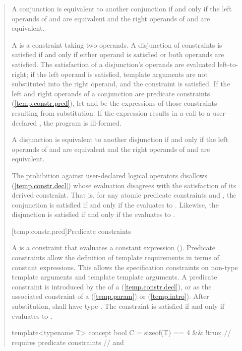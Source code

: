 \begin{quote}
A conjunction  is equivalent to another conjunction 
if and only if the left operands of  and  are equivalent
and the right operands of  and  are equivalent.

\pnum
A  is a constraint taking two 
operands. A disjunction of constraints is satisfied if and only 
if either operand is satisfied or both operands are satisfied.
% 
The satisfaction of a disjunction's operands are evaluated left-to-right; 
if the left operand is satisfied, template arguments are not 
substituted into the right operand, and the constraint is satisfied.
%
If the left and right operands of a conjunction are predicate constraints
(\ref{temp.constr.pred}), let  and  be the expressions
of those constraints resulting from substitution. If the expression
 results in a call to a user-declared ,
the program is ill-formed.

A disjunction  is equivalent to another disjunction 
if and only if the left operands of  and  are equivalent
and the right operands of  and  are equivalent.

\pnum
\enternote
The prohibition against user-declared logical operators disallows
 (\ref{temp.constr.decl}) whose 
evaluation disagrees with the satisfaction of its derived constraint.
That is, for any atomic predicate constraints  and ,
the conjunction  is satisfied if and only if
the   evaluates to
. Likewise, the disjunction  is satisfied 
if and only if the  
evaluates to .
\exitnote


[temp.constr.pred]{Predicate constraints}

\pnum
A  is a constraint that evaluates a constant 
expression  ().
% 
\enternote
Predicate constraints allow the definition of template requirements
in terms of constant expressions. This allows the specification 
constraints on non-type template arguments and template template 
arguments.
\exitnote
% 
\enternote
A predicate constraint is introduced by the 
of a 
 (\ref{temp.constr.decl}), 
or as the associated constraint of a
 (\ref{temp.param}) or
 (\ref{temp.intro}).
\exitnote
% 
After substitution,  shall have type .
% 
The constraint is satisfied if and only if  evaluates to 
.
% 
\enterexample
\begin{codeblock}
template<typename T> 
  concept bool C = sizeof(T) == 4 && !true; // requires predicate constraints
                                            //  and 


\end{codeblock}
\end{quote}
